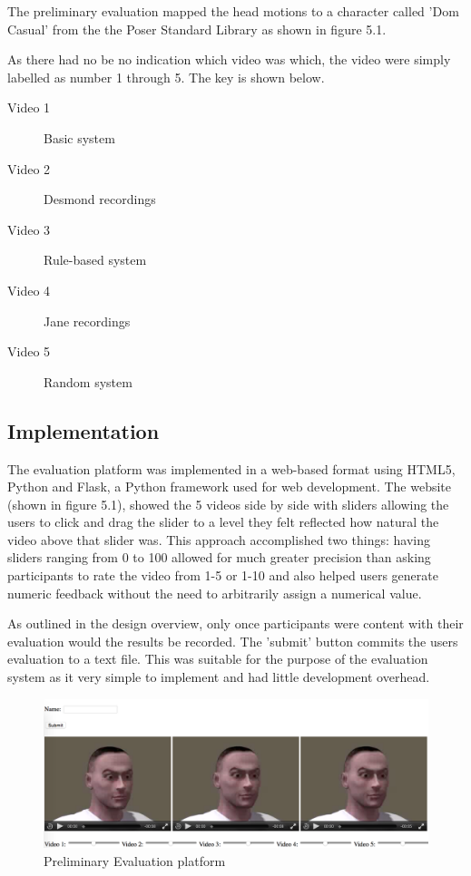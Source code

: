 \documentclass[bsc,frontabs,twoside,singlespacing,parskip]{infthesis}
\begin{document}
The preliminary evaluation mapped the head motions to a character called 'Dom Casual' from the the Poser Standard Library as shown in figure 5.1.

As there had no be no indication which video was which, the video were simply labelled as number 1 through 5. The key is shown below.

\begin{description}
  	\item[Video 1]	Basic system
  	\item[Video 2] Desmond recordings
	\item[Video 3] Rule-based system
	\item[Video 4] Jane recordings
	\item[Video 5] Random system
\end{description}


\subsection{Implementation}

The evaluation platform was implemented in a web-based format using HTML5, Python and Flask, a Python framework used for web development. The website (shown in figure 5.1), showed the 5 videos side by side with sliders allowing the users to click and drag the slider to a level they felt reflected how natural the video above that slider was. This approach accomplished two things: having sliders ranging from 0 to 100 allowed for much greater precision than asking participants to rate the video from 1-5 or 1-10 and also helped users generate numeric feedback without the need to arbitrarily assign a numerical value.

As outlined in the design overview, only once participants were content with their evaluation would the results be recorded. The 'submit' button commits the users evaluation to a text file. This was suitable for the purpose of the evaluation system as it very simple to implement and had little development overhead.

\begin{figure}
	\centering
	\includegraphics[width=1.0\textwidth]{eval_2.png}
	\caption{Preliminary Evaluation platform}
\end{figure}
\end{document}
